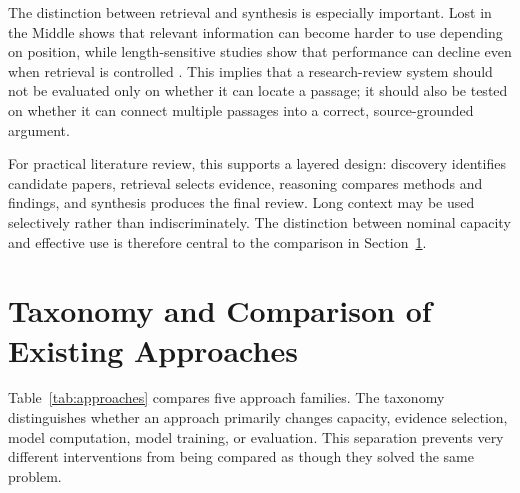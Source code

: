 \documentclass[manuscript,screen,oneside]{acmart}
\begin{document}
The distinction between retrieval and synthesis is especially important. Lost in the Middle shows that relevant information can become harder to use depending on position, while length-sensitive studies show that performance can decline even when retrieval is controlled \cite{liu2024lost,du2025contextlength}. This implies that a research-review system should not be evaluated only on whether it can locate a passage; it should also be tested on whether it can connect multiple passages into a correct, source-grounded argument.

For practical literature review, this supports a layered design: discovery identifies candidate papers, retrieval selects evidence, reasoning compares methods and findings, and synthesis produces the final review. Long context may be used selectively rather than indiscriminately. The distinction between nominal capacity and effective use is therefore central to the comparison in Section~\ref{sec:comparison}.

\section{Taxonomy and Comparison of Existing Approaches}\label{sec:comparison}
Table~\ref{tab:approaches} compares five approach families. The taxonomy distinguishes whether an approach primarily changes capacity, evidence selection, model computation, model training, or evaluation. This separation prevents very different interventions from being compared as though they solved the same problem.
\end{document}
